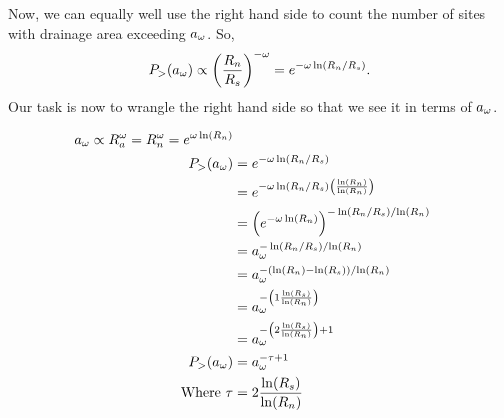 \begin{enumerate}
    Now, we can equally well use the right hand side to count the
    number of sites with drainage area exceeding $a_{\omega}$.
    So,
    $$
    P_{>} (a_{\omega})
    \propto
    \left(
    \frac{R_n}{R_s}
    \right)^{-\omega}
    =
    e^{-\omega \ln (R_n/R_s)}.
    $$
    Our task is now to wrangle the right hand side so
    that we see it in terms of $a_{\omega}$.


    
   \solutionstart
   
   \begin{align}
   a_\omega \propto R_a^\omega = R_n^\omega = e^{\omega\ln(R_n)}\\
   P_{>} (a_{\omega})
   &= e^{-\omega \ln (R_n/R_s)}\\
   &= e^{-\omega \ln (R_n/R_s)\left(\frac{\ln (R_n)}{\ln (R_n)}\right)}\\
   &= \left(e^{-\omega \ln (R_n)}\right)^{-\ln (R_n / R_s) / {\ln (R_n)}}\\
   &= a_{\omega}^{-\ln (R_n / R_s) / {\ln (R_n)}}\\
   &= a_{\omega}^{-\left(\ln (R_n) - \ln (R_s)\right) / {\ln (R_n)}}\\
   &= a_{\omega}^{-\left(1 \frac{\ln (R_s)}{\ln (R_n)}\right)}\\
   &= a_{\omega}^{-\left(2 \frac{\ln (R_s)}{\ln (R_n)}\right)+1}\\
   P_{>} (a_{\omega}) &= a_{\omega}^{-\tau +1}\\
   \text{Where } \tau &= 2 \frac{\ln (R_s)}{\ln (R_n)}
   \end{align}
   \solutionend
  
\end{enumerate}